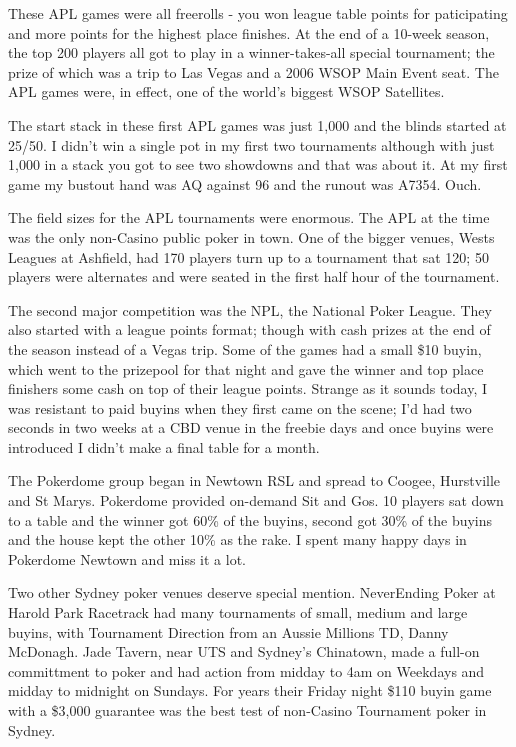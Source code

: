 These APL games were all freerolls - you won league table points for
paticipating and more points for the highest place finishes. At the
end of a 10-week season, the top 200 players all got to play in a
winner-takes-all special tournament; the prize of which was a trip to
Las Vegas and a 2006 WSOP Main Event seat. The APL games were, in
effect, one of the world's biggest WSOP Satellites.

The start stack in these first APL games was just 1,000 and the blinds
started at 25/50. I didn't win a single pot in my first two
tournaments although with just 1,000 in a stack you got to see two
showdowns and that was about it. At my first game my bustout hand was
AQ against 96 and the runout was A7354. Ouch.

The field sizes for the APL tournaments were enormous. The APL at the
time was the only non-Casino public poker in town. One of the bigger
venues, Wests Leagues at Ashfield, had 170 players turn up to a
tournament that sat 120; 50 players were alternates and were seated in
the first half hour of the tournament.

The second major competition was the NPL, the National Poker
League. They also started with a league points format; though with
cash prizes at the end of the season instead of a Vegas trip. Some of
the games had a small \$10 buyin, which went to the prizepool for that
night and gave the winner and top place finishers some cash on top of
their league points. Strange as it sounds today, I was resistant to
paid buyins when they first came on the scene; I'd had two seconds in
two weeks at a CBD venue in the freebie days and once buyins were
introduced I didn't make a final table for a month.


The Pokerdome group began in Newtown RSL and spread to Coogee,
Hurstville and St Marys. Pokerdome provided on-demand Sit and Gos.
10 players sat down to a table and the winner got 60\% of the buyins,
second got 30\% of the buyins and the house kept the other 10\% as the
rake. I spent many happy days in Pokerdome Newtown and miss it a lot.

Two other Sydney poker venues deserve special mention. NeverEnding
Poker at Harold Park Racetrack had many tournaments of small, medium
and large buyins, with Tournament Direction from an Aussie Millions
TD, Danny McDonagh. Jade Tavern, near UTS and Sydney's Chinatown, made
a full-on committment to poker and had action from midday to 4am on
Weekdays and midday to midnight on Sundays. For years their Friday
night \$110 buyin game with a \$3,000 guarantee was the best test of
non-Casino Tournament poker in Sydney.

